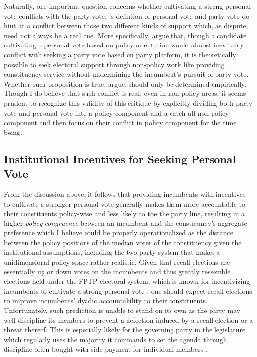 \documentclass{article}
\begin{document}
			Naturally, one important question concerns
			whether cultivating a strong personal vote
			conflicts with the party vote.
			\citeauthor{cainPersonalVoteConstituency1987}'s
			\autocite*{cainPersonalVoteConstituency1987}
			defintion of personal vote and party vote
			do
			hint at a conflict between those two different kinds of support
			which,
			as
			\citeauthor{carseyRethinkingNormalVote2017}
			\autocite*{carseyRethinkingNormalVote2017}
			dispute,
			need not always be a real one.
			More specifically,
			\citeauthor{carseyRethinkingNormalVote2017}
			\autocite*{carseyRethinkingNormalVote2017}
			argue that,
			though a candidate cultivating a personal vote based on policy orientation
			would almost inevitably conflict with seeking a party vote based on party platform,
			it is theoretically possible to
			seek electoral support through non-policy work like providing constituency service
			without undermining the incumbent's pursuit of party vote.
			Whether such proposition is true,
			\citeauthor{carseyRethinkingNormalVote2017}
			\autocite*{carseyRethinkingNormalVote2017}
			argue,
			should only be determined empirically.
			Though I do believe that such conflict is real, even in non-policy areas,
			it seems prudent
			to recognize this validity of this critique 
			by explicitly dividing both party vote and personal vote into
			a
			policy component
			and a
			catch-all
			non-policy component
			and
			then
			focus on their conflict in policy component for the time being.
			
			
		\subsection*{Institutional Incentives for Seeking Personal Vote}
			
			From the discussion above,
			it follows that providing incumbents with incentives to cultivate a stronger personal vote
			generally makes them more accountable to their constituents policy-wise and
			less likely to toe
			the party line,
			resulting in a higher \textit{policy congruence} between an incumbent and the constieuncy's aggregate preference
			which I believe could be properly operationalized
			as the distance between the policy positions of the median voter of the constituency
			given the institutional assumptions, including the two-party system
			that makes a unidimensional policy space rather realistic.
			Given that recall elections are essentially
			up or down votes on the incumbents
			and thus greatly ressemble elections held under the
			FPTP electoral system,
			which is known for incentivizing incumbents to cultivate a strong personal vote
			\autocite{careyIncentivesCultivatePersonal1995},
			one should expect recall elections
			to improve incumbents' dyadic accountability to their constituents.
			Unfortunately,
			such prediction is unable to stand on its own
			as the party may well discipline
			its members to prevent a defection induced by a recall election or a threat thereof.
			This is especially likely for the governing party in the legislature
			which
			regularly
			uses the majority it commands to set the agenda
			through discipline often bought with
			side payment for individual members
			\autocite{coxSettingAgendaResponsible2005}.
			
\end{document}
